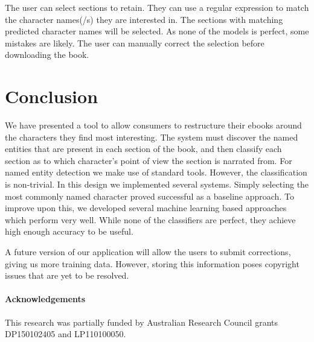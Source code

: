 \documentclass[11pt,a4paper]{article}
\begin{document}
The user can select sections to retain.
They can use a regular expression to match the character names(/s) they are interested in.
The sections with matching predicted character names will be selected.
As none of the models is perfect, some mistakes are likely.
The user can manually correct the selection before downloading the book.



\section{Conclusion}\label{sec:conclusion}
We have presented a tool to allow consumers to restructure their ebooks around the characters they find most interesting.
The system must discover the named entities that are present in each section of the book,
and then classify each section as to which character's point of view the section is narrated from.
For named entity detection we make use of standard tools.
However, the classification is non-trivial.
In this design we implemented several systems.
Simply selecting the most commonly named character proved successful as a baseline approach.
To improve upon this, we developed several machine learning based approaches which perform very well.
While none of the classifiers are perfect, they achieve high enough accuracy to be useful.

A future version of our application will allow the users to submit corrections, giving us more training data.
However, storing this information poses copyright issues that are yet to be resolved.

\paragraph{Acknowledgements}
This research was partially funded by Australian Research Council grants DP150102405 and LP110100050.


\end{document}
